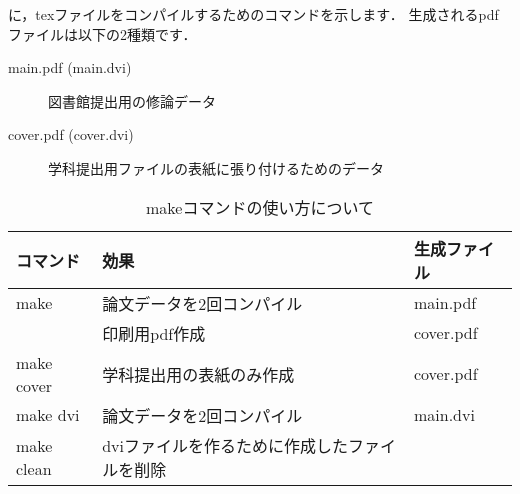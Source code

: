 に，texファイルをコンパイルするためのコマンドを示します．
生成されるpdfファイルは以下の2種類です．
\begin{description}
\item[main.pdf (main.dvi)] 図書館提出用の修論データ
\item[cover.pdf (cover.dvi) ] 学科提出用ファイルの表紙に張り付けるためのデータ
\end{description}

\begin{table}[htb]
\begin{center}
\caption{makeコマンドの使い方について}
\label{tb:6_arc}
{\tabcolsep=0.3cm
\begin{tabular}{l|l|l}
\hline\hline
コマンド  & 効果 & 生成ファイル \\
\hline
make       & 論文データを2回コンパイル & main.pdf   \\
                   & 印刷用pdf作成                  & cover.pdf  \\                  \hline
make cover & 学科提出用の表紙のみ作成  & cover.pdf  \\                      \hline
make dvi   & 論文データを2回コンパイル & main.dvi   \\                      \hline
make clean & dviファイルを作るために作成したファイルを削除& \\       \hline 
\end{tabular}}
\end{center}
\end{table}




